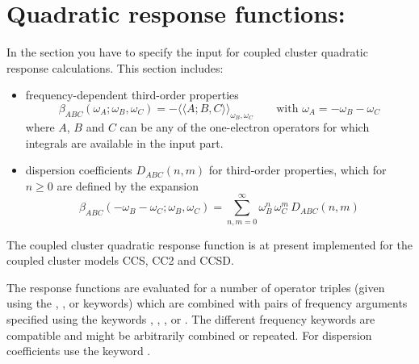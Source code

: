 
\section{Quadratic response functions: }
\label{sec:ccqr}

In the  section you have to specify the input for
coupled cluster quadratic response calculations. This section
includes:
\begin{itemize}
\item frequency-dependent third-order properties
      $$\beta_{ABC}(\omega_A;\omega_B,\omega_C) = -
        \langle\langle A; B, C\rangle\rangle_{\omega_B,\omega_C} 
        \qquad \mbox{with~} \omega_A = -\omega_B - \omega_C
       $$
      where $A$, $B$ and $C$ can be any of the one-electron operators
      for which integrals are available in the  
      input part.
\item dispersion coefficients $D_{ABC}(n,m)$ for third-order properties,
      which for $n\ge 0$ are defined by the expansion
      $$ \beta_{ABC}(-\omega_B-\omega_C;\omega_B,\omega_C)  = 
        \sum_{n,m=0}^{\infty} \omega_{B}^n \, \omega_{C}^m \, D_{ABC}(n,m) 
      $$
\end{itemize}
The coupled cluster quadratic response function is at present
implemented for the coupled cluster models CCS, CC2 and CCSD.

The response functions are evaluated for a number of 
operator triples (given using the
, , or  keywords) 
which are combined with pairs of frequency arguments specified using the 
keywords , , , 
or . 
The different frequency keywords are 
compatible and might be arbitrarily combined or repeated.
For dispersion coefficients use the keyword .

\begin{center}
\end{center}



